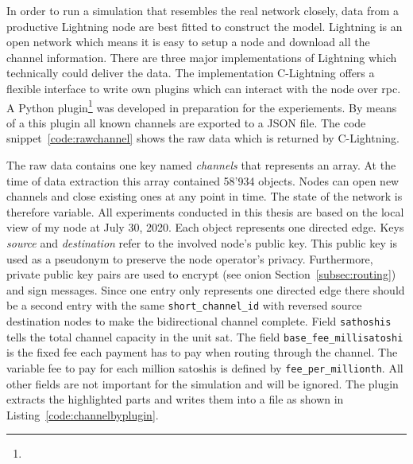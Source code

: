 \documentclass[final]{fhnwreport}       %
\begin{document}
In order to run a simulation that resembles the real network closely, data from a productive Lightning node are best fitted to construct the model. Lightning is an open network which means it is easy to setup a node and download all the channel information. There are three major implementations of Lightning which technically could deliver the data. The implementation \mbox{C-Lightning} offers a flexible interface to write own plugins which can interact with the node over \gls{rpc}. A Python plugin\footnote{\gitpluginurl} was developed in preparation for the experiements. By means of a this plugin all known channels are exported to a JSON file. The code snippet~\ref{code:rawchannel} shows the raw data which is returned by C-Lightning. 


The raw data contains one key named \emph{channels} that represents an array. At the time of data extraction this array contained 58'934 objects. Nodes can open new channels and close existing ones at any point in time. The state of the network is therefore variable. All experiments conducted in this thesis are based on the local view of my node at July 30, 2020. Each object represents one directed edge. Keys \emph{source} and \emph{destination} refer to the involved node's public key. This public key is used as a pseudonym to preserve the node operator's privacy. Furthermore, private public key pairs are used to encrypt (see onion Section~\ref{subsec:routing}) and sign messages. Since one entry only represents one directed edge there should be a second entry with the same \texttt{short\_channel\_id} with reversed source destination nodes to make the bidirectional channel complete. Field \texttt{sathoshis} tells the total channel capacity in the unit sat. The field \texttt{base\_fee\_millisatoshi} is the fixed fee each payment has to pay when routing through the channel. The variable fee to pay for each million satoshis is defined by \texttt{fee\_per\_millionth}. All other fields are not important for the simulation and will be ignored. The plugin extracts the highlighted parts and writes them into a file as shown in Listing~\ref{code:channelbyplugin}. 
\end{document}
